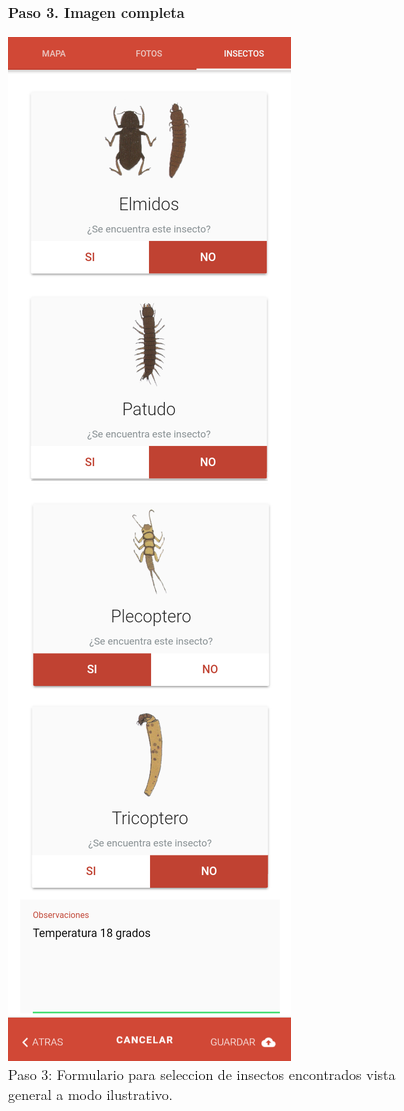 				\begin{figure}[H]
					\centering
					\textbf{Paso 3. Imagen completa}\par\medskip
					\includegraphics[height=1.2\textwidth]{Screenshots/registroPaso3Completo.png}
					\caption{Paso 3: Formulario para seleccion de insectos encontrados vista general a modo ilustrativo.}
				\end{figure}
				
